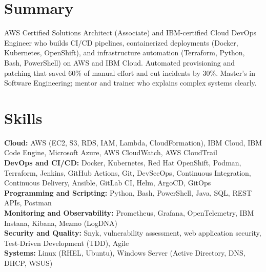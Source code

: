 \documentclass[a4paper,10pt]{article}
\begin{document}

\section*{Summary}
AWS Certified Solutions Architect (Associate) and IBM-certified Cloud DevOps Engineer who builds CI/CD pipelines, containerized deployments (Docker, Kubernetes, OpenShift), and infrastructure automation (Terraform, Python, Bash, PowerShell) on AWS and IBM Cloud. Automated provisioning and patching that saved 60\% of manual effort and cut incidents by 30\%. Master's in Software Engineering; mentor and trainer who explains complex systems clearly.

\section*{Skills}
\textbf{Cloud:} AWS (EC2, S3, RDS, IAM, Lambda, CloudFormation), IBM Cloud, IBM Code Engine, Microsoft Azure, AWS CloudWatch, AWS CloudTrail \\
\textbf{DevOps and CI/CD:} Docker, Kubernetes, Red Hat OpenShift, Podman, Terraform, Jenkins, GitHub Actions, Git, DevSecOps, Continuous Integration, Continuous Delivery, Ansible, GitLab CI, Helm, ArgoCD, GitOps \\
\textbf{Programming and Scripting:} Python, Bash, PowerShell, Java, SQL, REST APIs, Postman\\
\textbf{Monitoring and Observability:} Prometheus, Grafana, OpenTelemetry, IBM Instana, Kibana, Mezmo (LogDNA)\\
\textbf{Security and Quality:} Snyk, vulnerability assessment, web application security, Test-Driven Development (TDD), Agile\\
\textbf{Systems:} Linux (RHEL, Ubuntu), Windows Server (Active Directory, DNS, DHCP, WSUS)
\end{document}
